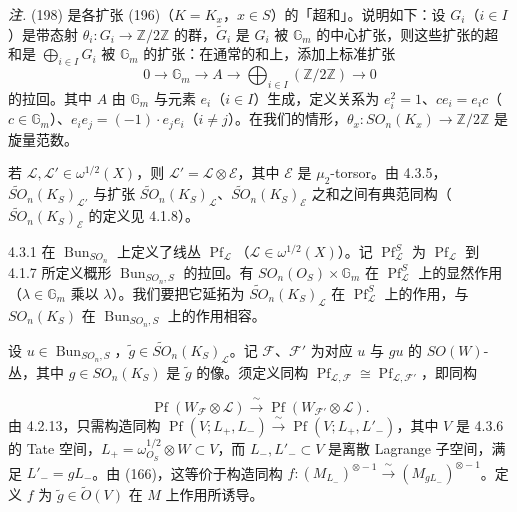 \emph{注.} (198) 是各扩张 (196)（$K=K_{x}$，$x\in S$）的「超和」。说明如下：设 $G_{i}$（$i\in I$）是带态射 $\theta_{i}:G_{i}\to\mathbb{Z}/2\mathbb{Z}$ 的群，$\tilde{G}_{i}$ 是 $G_{i}$ 被 $\mathbb{G}_{m}$ 的中心扩张，则这些扩张的超和是 $\bigoplus_{i\in I}G_{i}$ 被 $\mathbb{G}_{m}$ 的扩张：在通常的和上，添加上标准扩张
\[
0\to\mathbb{G}_{m}\to A\to\bigoplus_{i\in I}(\mathbb{Z}/2\mathbb{Z})\to 0
\]
的拉回。其中 $A$ 由 $\mathbb{G}_{m}$ 与元素 $e_{i}$（$i\in I$）生成，定义关系为 $e_{i}^{2}=1$、$ce_{i}=e_{i}c$（$c\in\mathbb{G}_{m}$）、$e_{i}e_{j}=(-1)\cdot e_{j}e_{i}$（$i\neq j$）。在我们的情形，$\theta_{x}:SO_{n}(K_{x})\to\mathbb{Z}/2\mathbb{Z}$ 是旋量范数。

若 $\mathcal{L},\mathcal{L}'\in\omega^{1/2}(X)$，则 $\mathcal{L}'=\mathcal{L}\otimes\mathcal{E}$，其中 $\mathcal{E}$ 是 $\mu_{2}$-torsor。由 4.3.5，$\tilde{SO}_{n}(K_{S})_{\mathcal{L}'}$ 与扩张 $\tilde{SO}_{n}(K_{S})_{\mathcal{L}}$、$\tilde{SO}_{n}(K_{S})_{\mathcal{E}}$ 之和之间有典范同构（$\tilde{SO}_{n}(K_{S})_{\mathcal{E}}$ 的定义见 4.1.8）。

 4.3.1 在 $\operatorname{Bun}_{SO_{n}}$ 上定义了线丛 $\operatorname{Pf}_{\mathcal{L}}$（$\mathcal{L}\in\omega^{1/2}(X)$）。记 $\operatorname{Pf}_{\mathcal{L}}^{S}$ 为 $\operatorname{Pf}_{\mathcal{L}}$ 到 4.1.7 所定义概形 $\operatorname{Bun}_{SO_{n},S}$ 的拉回。有 $SO_{n}(O_{S})\times\mathbb{G}_{m}$ 在 $\operatorname{Pf}_{\mathcal{L}}^{S}$ 上的显然作用（$\lambda\in\mathbb{G}_{m}$ 乘以 $\lambda$）。我们要把它延拓为 $\tilde{SO}_{n}(K_{S})_{\mathcal{L}}$ 在 $\operatorname{Pf}_{\mathcal{L}}^{S}$ 上的作用，与 $SO_{n}(K_{S})$ 在 $\operatorname{Bun}_{SO_{n},S}$ 上的作用相容。

设 $u\in\operatorname{Bun}_{SO_{n},S}$，$\tilde{g}\in\tilde{SO}_{n}(K_{S})_{\mathcal{L}}$。记 $\mathcal{F}$、$\mathcal{F}'$ 为对应 $u$ 与 $gu$ 的 $SO(W)$-丛，其中 $g\in SO_{n}(K_{S})$ 是 $\tilde{g}$ 的像。须定义同构 $\operatorname{Pf}_{\mathcal{L},\mathcal{F}}\cong\operatorname{Pf}_{\mathcal{L},\mathcal{F}'}$，即同构

\[
\operatorname{Pf}(W_{\mathcal{F}}\otimes\mathcal{L})\xrightarrow{\ \sim\ }\operatorname{Pf}(W_{\mathcal{F}'}\otimes\mathcal{L}).
\]
由 4.2.13，只需构造同构 $\operatorname{Pf}(V;L_{+},L_{-})\xrightarrow{\ \sim\ }\operatorname{Pf}(V;L_{+},L'_{-})$，其中 $V$ 是 4.3.6 的 Tate 空间，$L_{+}=\omega_{O_{S}}^{1/2}\otimes W\subset V$，而 $L_{-},L'_{-}\subset V$ 是离散 Lagrange 子空间，满足 $L'_{-}=gL_{-}$。由 (166)，这等价于构造同构 $f:(M_{L_{-}})^{\otimes-1}\xrightarrow{\ \sim\ }(M_{gL_{-}})^{\otimes-1}$。定义 $f$ 为 $\tilde{g}\in\tilde{O}(V)$ 在 $M$ 上作用所诱导。

